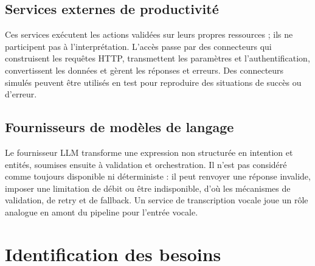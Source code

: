 \documentclass[11pt,a4paper,openany,oneside]{report}
\begin{document}
\subsection{Services externes de productivité}
Ces services exécutent les actions validées sur leurs propres ressources ; ils ne participent pas à l'interprétation. L'accès passe par des connecteurs qui construisent les requêtes HTTP, transmettent les paramètres et l'authentification, convertissent les données et gèrent les réponses et erreurs. Des connecteurs simulés peuvent être utilisés en test pour reproduire des situations de succès ou d'erreur.

\subsection{Fournisseurs de modèles de langage}
Le fournisseur LLM transforme une expression non structurée en intention et entités, soumises ensuite à validation et orchestration. Il n'est pas considéré comme toujours disponible ni déterministe : il peut renvoyer une réponse invalide, imposer une limitation de débit ou être indisponible, d'où les mécanismes de validation, de retry et de fallback. Un service de transcription vocale joue un rôle analogue en amont du pipeline pour l'entrée vocale.

\section{Identification des besoins}
\end{document}
